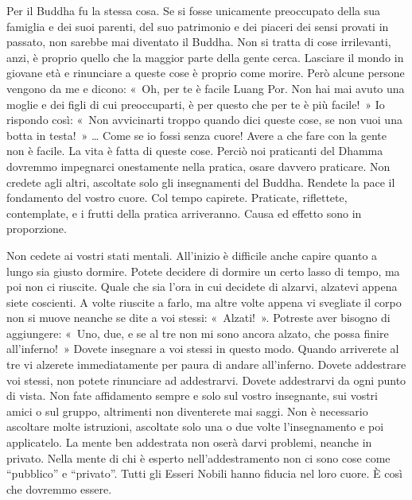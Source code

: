 Per il Buddha fu la stessa cosa. Se si fosse unicamente preoccupato
della sua famiglia e dei suoi parenti, del suo patrimonio e dei piaceri
dei sensi provati in passato, non sarebbe mai diventato il Buddha. Non
si tratta di cose irrilevanti, anzi, è proprio quello che la maggior
parte della gente cerca. Lasciare il mondo in giovane età e rinunciare a
queste cose è proprio come morire. Però alcune persone vengono da me e
dicono: «~Oh, per te è facile Luang Por. Non hai mai avuto una moglie e
dei figli di cui preoccuparti, è per questo che per te è più facile!~»
Io rispondo così: «~Non avvicinarti troppo quando dici queste cose, se
non vuoi una botta in testa!~» \ldots{} Come se io fossi senza cuore! Avere a
che fare con la gente non è facile. La vita è fatta di queste cose.
Perciò noi praticanti del Dhamma dovremmo impegnarci onestamente nella
pratica, osare davvero praticare. Non credete agli altri, ascoltate solo
gli insegnamenti del Buddha. Rendete la pace il fondamento del vostro
cuore. Col tempo capirete. Praticate, riflettete, contemplate, e i
frutti della pratica arriveranno. Causa ed effetto sono in proporzione.

Non cedete ai vostri stati mentali. All'inizio è difficile anche capire
quanto a lungo sia giusto dormire. Potete decidere di dormire un certo
lasso di tempo, ma poi non ci riuscite. Quale che sia l'ora in cui
decidete di alzarvi, alzatevi appena siete coscienti. A volte riuscite a
farlo, ma altre volte appena vi svegliate il corpo non si muove neanche
se dite a voi stessi: «~Alzati!~». Potreste aver bisogno di aggiungere:
«~Uno, due, e se al tre non mi sono ancora alzato, che possa finire
all'inferno!~» Dovete insegnare a voi stessi in questo modo. Quando
arriverete al tre vi alzerete immediatamente per paura di andare
all'inferno. Dovete addestrare voi stessi, non potete rinunciare ad
addestrarvi. Dovete addestrarvi da ogni punto di vista. Non fate
affidamento sempre e solo sul vostro insegnante, sui vostri amici o sul
gruppo, altrimenti non diventerete mai saggi. Non è necessario ascoltare
molte istruzioni, ascoltate solo una o due volte l'insegnamento e poi
applicatelo. La mente ben addestrata non oserà darvi problemi, neanche
in privato. Nella mente di chi è esperto nell'addestramento non ci sono
cose come ``pubblico'' e ``privato''. Tutti gli Esseri Nobili hanno
fiducia nel loro cuore. È così che dovremmo essere.

